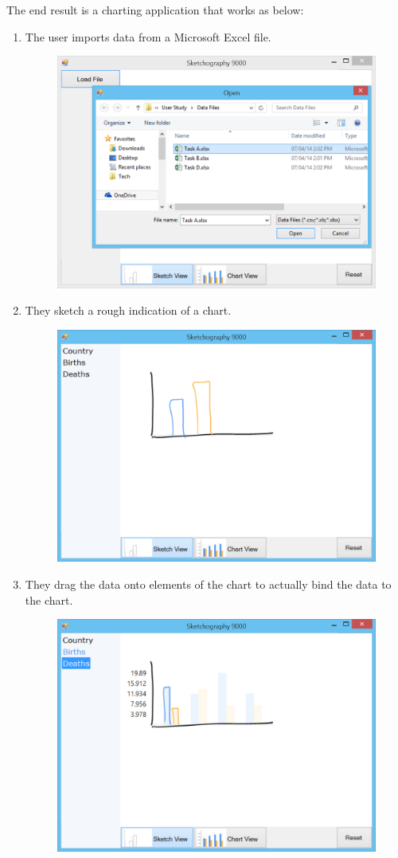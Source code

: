 The end result is a charting application that works as below:
\begin{enumerate}
\item The user imports data from a Microsoft Excel file.
	\begin{figure}[H]
	\centering
	\includegraphics[width=0.6\linewidth]{walk1}
	\end{figure}
\item They sketch a rough indication of a chart.
	\begin{figure}[H]
	\centering
	\includegraphics[width=0.6\linewidth]{walk2}
	\end{figure}
\item They drag the data onto elements of the chart to actually bind the data to the chart. 
	\begin{figure}[H]
	\centering
	\includegraphics[width=0.6\linewidth]{walk3}

\end{figure}
\end{enumerate}
